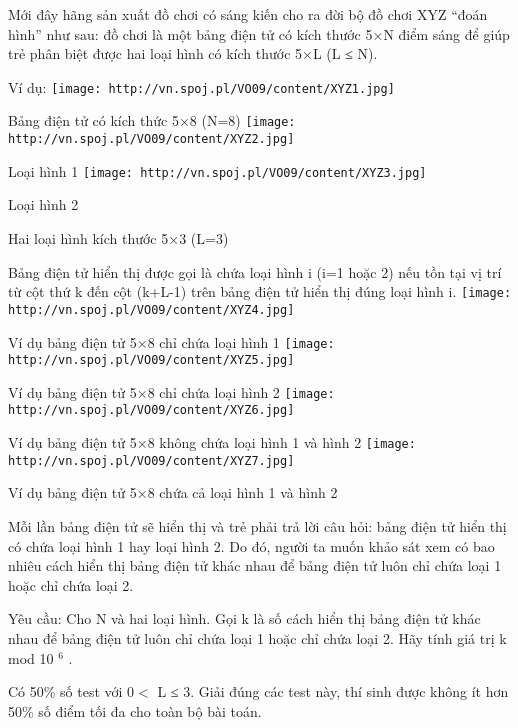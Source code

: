 Mới đây hãng sản xuất đồ chơi có sáng kiến cho ra đời bộ đồ chơi XYZ “đoán hình” như sau: đồ chơi là một bảng điện tử có kích thước 5×N điểm sáng để giúp trẻ phân biệt được hai loại hình có kích thước 5×L (L ≤ N).  

   Ví dụ:  
\texttt{[image: http://vn.spoj.pl/VO09/content/XYZ1.jpg]}

               Bảng điện tử có kích thức 5×8 (N=8)             
\texttt{[image: http://vn.spoj.pl/VO09/content/XYZ2.jpg]}

                       Loại hình 1                     
\texttt{[image: http://vn.spoj.pl/VO09/content/XYZ3.jpg]}

                       Loại hình 2                     

                       Hai loại hình kích thước 5×3 (L=3)                     

   Bảng điện tử hiển thị được gọi là chứa loại hình i (i=1 hoặc 2) nếu tồn tại vị trí từ cột thứ k đến cột (k+L-1) trên bảng điện tử hiển thị đúng loại hình i.  
\texttt{[image: http://vn.spoj.pl/VO09/content/XYZ4.jpg]}

               Ví dụ bảng điện tử 5×8 chỉ chứa loại hình 1             
\texttt{[image: http://vn.spoj.pl/VO09/content/XYZ5.jpg]}

               Ví dụ bảng điện tử 5×8 chỉ chứa loại hình 2             
\texttt{[image: http://vn.spoj.pl/VO09/content/XYZ6.jpg]}

               Ví dụ bảng điện tử 5×8  không chứa loại hình 1 và hình 2             
\texttt{[image: http://vn.spoj.pl/VO09/content/XYZ7.jpg]}

               Ví dụ bảng điện tử 5×8  chứa cả loại hình 1 và hình 2             

   Mỗi lần bảng điện tử sẽ hiển thị và trẻ phải trả lời câu hỏi: bảng điện tử hiển thị có chứa loại hình 1 hay loại hình 2. Do đó, người ta muốn khảo sát xem có bao nhiêu cách hiển thị bảng điện tử khác nhau để bảng điện tử luôn chỉ chứa loại 1 hoặc chỉ chứa loại 2.  

   Yêu cầu: Cho N và hai loại hình. Gọi k là số cách hiển thị bảng điện tử khác nhau để bảng điện tử luôn chỉ chứa loại 1 hoặc chỉ chứa loại 2. Hãy tính giá trị k  mod 10   $^    6   $   .  

Có 50\% số test với 0$<$ L ≤ 3. Giải đúng các test này, thí sinh được không ít hơn 50\% số điểm tối đa cho toàn bộ bài toán.